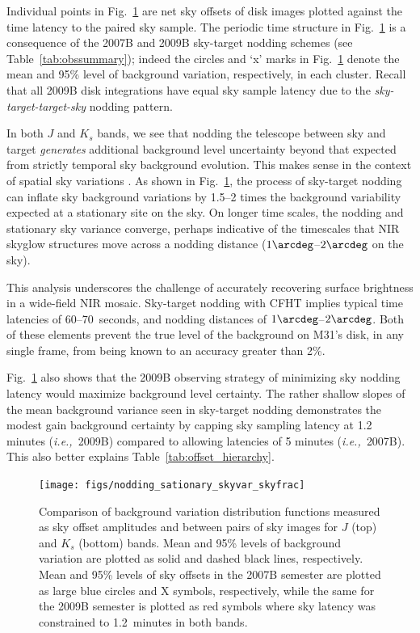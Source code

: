 \documentclass[iop]{emulateapj}
\newcommand{\ie}{\textit{i.e.,~}}
\newcommand{\mycomment}[1]{\textcolor{OliveGreen}{\textit{#1}}} %
\newcommand{\Fig}[1]{Fig.~\ref{fig:#1}}  %
\newcommand{\Tab}[1]{Table~\ref{tab:#1}}  %
\begin{document}
Individual points in \Fig{nodding_stationary_skyvar_skyfrac} are net sky offsets of disk images plotted against the time latency to the paired sky sample.
The periodic time structure in \Fig{nodding_stationary_skyvar_skyfrac} is a consequence of the 2007B and 2009B sky-target nodding schemes (see \Tab{obssummary}); indeed the circles and `x' marks in \Fig{nodding_stationary_skyvar_skyfrac} denote the mean and 95\% level of background variation, respectively, in each cluster.
Recall that all 2009B disk integrations have equal sky sample latency due to the \emph{sky-target-target-sky} nodding pattern.

In both $J$ and $K_s$ bands, we see that nodding the telescope between sky and target \emph{generates} additional background level uncertainty beyond that expected from strictly temporal sky background evolution.
This makes sense in the context of spatial sky variations \citep{Adams:1996}.
As shown in \Fig{nodding_stationary_skyvar_skyfrac}, the process of sky-target nodding can inflate sky background variations by 1.5--2 times the background variability expected at a stationary site on the sky.
On longer time scales, the nodding and stationary sky variance converge, perhaps indicative of the timescales that NIR skyglow structures move across a nodding distance ($1\arcdeg$--$2\arcdeg$ on the sky).


This analysis underscores the challenge of accurately recovering surface brightness in a wide-field NIR mosaic.
Sky-target nodding with CFHT implies typical time latencies of 60--70~seconds, and nodding distances of $1\arcdeg$--$2\arcdeg$.
Both of these elements prevent the true level of the background on M31's disk, in any single frame, from being known to an accuracy greater than 2\%.

\Fig{nodding_stationary_skyvar_skyfrac} also shows that the 2009B observing strategy of minimizing sky nodding latency would maximize background level certainty.
The rather shallow slopes of the mean background variance seen in sky-target nodding demonstrates the modest gain background certainty by capping sky sampling latency at 1.2 minutes (\ie 2009B) compared to allowing latencies of 5 minutes (\ie 2007B).
This also better explains \Tab{offset_hierarchy}.

\begin{figure}[t]
\centering
\texttt{[image: figs/nodding\_sationary\_skyvar\_skyfrac]}
\caption{Comparison of background variation distribution functions measured as sky offset amplitudes and between pairs of sky images for $J$ (top) and $K_s$ (bottom) bands.
Mean and 95\% levels of background variation are plotted as solid and dashed black lines, respectively.
Mean and 95\% levels of sky offsets in the 2007B semester are plotted as large blue circles and X symbols, respectively, while the same for the 2009B semester is plotted as red symbols where sky latency was constrained to 1.2~minutes in both bands.}
\label{fig:nodding_stationary_skyvar_skyfrac}
\end{figure}
\end{document}
